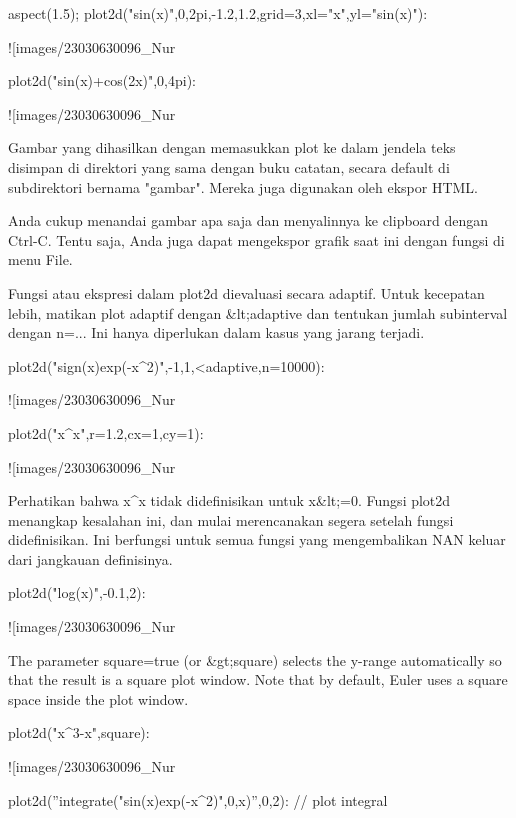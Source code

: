 \documentclass{article}
\begin{document}
\>aspect(1.5); plot2d("sin(x)",0,2pi,-1.2,1.2,grid=3,xl="x",yl="sin(x)"):


![images/23030630096_Nur%

\>plot2d("sin(x)+cos(2\*x)",0,4pi):


![images/23030630096_Nur%

Gambar yang dihasilkan dengan memasukkan plot ke dalam jendela teks
disimpan di direktori yang sama dengan buku catatan, secara default di
subdirektori bernama "gambar". Mereka juga digunakan oleh ekspor HTML.


Anda cukup menandai gambar apa saja dan menyalinnya ke clipboard
dengan Ctrl-C. Tentu saja, Anda juga dapat mengekspor grafik saat ini
dengan fungsi di menu File.


Fungsi atau ekspresi dalam plot2d dievaluasi secara adaptif. Untuk
kecepatan lebih, matikan plot adaptif dengan &lt;adaptive dan tentukan
jumlah subinterval dengan n=... Ini hanya diperlukan dalam kasus yang
jarang terjadi.


\>plot2d("sign(x)\*exp(-x^2)",-1,1,<adaptive,n=10000):


![images/23030630096_Nur%

\>plot2d("x^x",r=1.2,cx=1,cy=1):


![images/23030630096_Nur%

Perhatikan bahwa x^x tidak didefinisikan untuk x&lt;=0. Fungsi plot2d
menangkap kesalahan ini, dan mulai merencanakan segera setelah fungsi
didefinisikan. Ini berfungsi untuk semua fungsi yang mengembalikan NAN
keluar dari jangkauan definisinya.


\>plot2d("log(x)",-0.1,2):


![images/23030630096_Nur%

The parameter square=true (or &gt;square) selects the y-range automatically so that the
result is a square plot window. Note that by default, Euler uses a square space inside
the plot window.


\>plot2d("x^3-x",\>square):


![images/23030630096_Nur%

\>plot2d(''integrate("sin(x)\*exp(-x^2)",0,x)'',0,2): // plot integral
\end{document}
